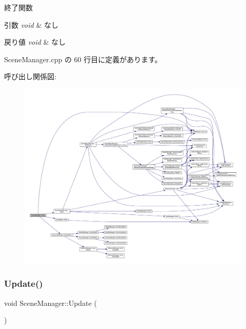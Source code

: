 終了関数 


\begin{DoxyParams}{引数}
{\em void} & なし \\
\hline
\end{DoxyParams}

\begin{DoxyRetVals}{戻り値}
{\em void} & なし \\
\hline
\end{DoxyRetVals}


 Scene\+Manager.\+cpp の 60 行目に定義があります。

呼び出し関係図\+:
\nopagebreak
\begin{figure}[H]
\begin{center}
\leavevmode
\includegraphics[width=350pt]{class_scene_manager_ae3ff21f2261fc50f1e860cf7fc3a2108_cgraph}
\end{center}
\end{figure}
\mbox{\label{class_scene_manager_a63dcf65832d6a2c190bf496d9a3b00a3}} 
\subsubsection{\texorpdfstring{Update()}{Update()}}
{\footnotesize\ttfamily void Scene\+Manager\+::\+Update (\begin{DoxyParamCaption}{ }\end{DoxyParamCaption})}



